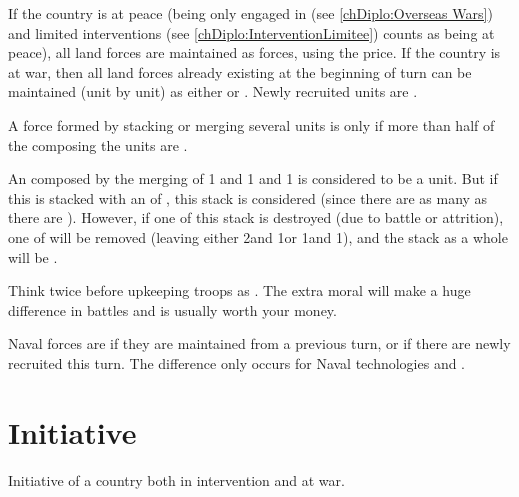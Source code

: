  If the country is at peace (being only engaged in
 (see \ref{chDiplo:Overseas Wars}) and limited
interventions (see \ref{chDiplo:InterventionLimitee}) counts as being at
peace), all land forces are maintained as  forces, using the
 price.
\bparag If the country is at war, then all land forces already existing at the
beginning of turn can be maintained (unit by unit) as either 
or . Newly recruited units are .

 A force formed by stacking or merging several units is
 only if more than half of the \LD composing the units are
.
\begin{exemple}
  An \ARMY\faceplus composed by the merging of 1  \LD and 1
   \ARMY\facemoins and 1  \LD is considered to
  be a  unit. But if this \ARMY\faceplus is stacked with an
  \ARMY\facemoins of , this stack is considered
   (since there are as many  as there are
  ). However, if one \LD of this stack is destroyed (due to
  battle or attrition), one \LD of  will be removed (leaving
  either 2\ARMY\facemoins and 1\LD or 1\ARMY\faceplus and 1\LD), and the stack
  as a whole will be .
\end{exemple}

\begin{playtip}
  Think twice before upkeeping troops as . The extra moral
  will make a huge difference in battles and is usually worth your money.
\end{playtip}

\aparag[Navy] Naval forces are  if they are maintained from a
previous turn, or  if there are newly recruited this turn.
\bparag The difference only occurs for Naval technologies  and
.%


\section{Initiative}
Initiative of a country both in intervention and at war.

